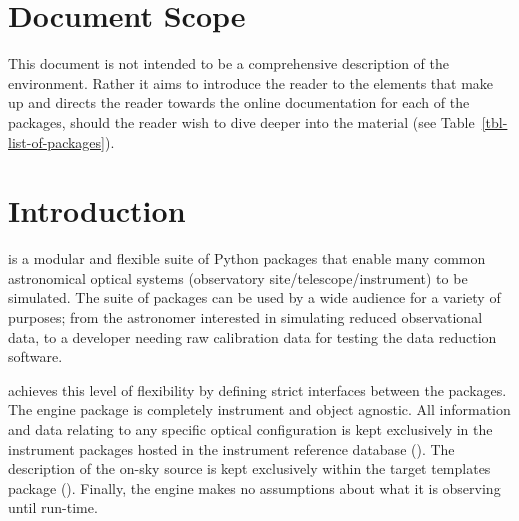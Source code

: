 \section{Document Scope}
\label{document-scope}

This document is not intended to be a comprehensive description of the
\ScopeSim{} environment.  Rather it aims to introduce the reader to
the elements that make up \ScopeSim{} and directs the reader towards
the online documentation for each of the packages, should the reader
wish to dive deeper into the material (see
Table~\ref{tbl-list-of-packages}).


\section{Introduction}
\label{introduction}

\ScopeSim{} is a modular and flexible suite of Python packages that
enable many common astronomical optical systems (observatory
site/telescope/instrument) to be simulated.  The suite of packages can
be used by a wide audience for a variety of purposes; from the
astronomer interested in simulating reduced observational data, to a
developer needing raw calibration data for testing the data reduction
software.

\ScopeSim{} achieves this level of flexibility by defining strict
interfaces between the packages. The \ScopeSim{} engine package is
completely instrument and object agnostic.  All information and data
relating to any specific optical configuration is kept exclusively in
the instrument packages hosted in the instrument reference database
(\IRDB{}).  The description of the on-sky source is kept exclusively
within the target templates package (\ScopeSimtemplates{}).  Finally,
the engine makes no assumptions about what it is observing until
run-time.


